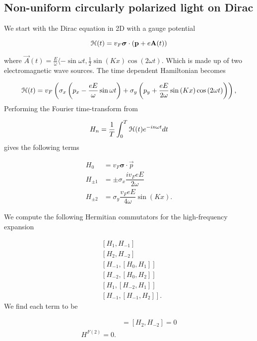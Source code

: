 \subsection{Non-uniform circularly polarized light on Dirac} \label{fll-dirac-derivation}
We start with the Dirac equation in 2D with a gauge potential

\begin{equation}
  \mathcal{H}(t) = v_{F} \bm{\sigma} \cdot \left(\mathbf{p}+e\mathbf{A}(t)\right)
\end{equation}

where $\vec{A}(t) = \tfrac{E}{\omega} \langle -\sin{\omega t}, \tfrac{1}{2} \sin{(Kx)} \cos{(2\omega t)}$.
Which is made up of two electromagnetic wave sources.
The time dependent Hamiltonian becomes

\begin{equation}
  \mathcal{H}(t) = v_{F} \left( \sigma_x \left(p_x - \dfrac{eE}{\omega} \sin{\omega t} \right) + \sigma_y \left(p_y + \dfrac{eE}{2\omega} \sin{(Kx)} \cos{(2\omega t)} \right) \right),
\end{equation}
Performing the Fourier time-transform from

\begin{equation}
  H_n = \dfrac{1}{T} \int_{0}^{T} \mathcal{H}(t) e^{-in\omega t} dt
\end{equation}
gives the following terms

\begin{align}
  H_0 &= v_{F} \bm{\sigma}\cdot \vec{p} \\
  H_{\pm1} &= \pm \sigma_x \dfrac{i v_{F} eE}{2\omega} \\
  H_{\pm2} &= \sigma_y \dfrac{v_{F} eE}{4\omega} \sin{(Kx)}.
\end{align}

We compute the following Hermitian commutators for the high-frequency expansion

\begin{align}
  &[H_{1}, H_{-1}] \\
  &[H_{2}, H_{-2}] \\
  &[H_{-1}, [H_{0}, H_{1}]] \\
  &[H_{-2}, [H_{0}, H_{2}]] \\
  &[H_{1}, [H_{-2}, H_{1}]] \\
  &[H_{-1}, [H_{-1}, H_{2}]].
\end{align}
We find each term to be

\begin{align}
  [H_{1}, H_{-1}] &= [H_{2}, H_{-2}] = 0 \\
  H^{F(2)} = 0.
\end{align}

